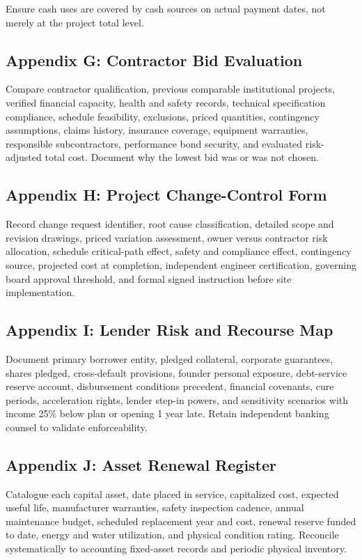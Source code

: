 Ensure cash uses are covered by cash sources on actual payment dates, not merely at the project total level.

\subsection{Appendix G: Contractor Bid Evaluation}

Compare contractor qualification, previous comparable institutional projects, verified financial capacity, health and safety records, technical specification compliance, schedule feasibility, exclusions, priced quantities, contingency assumptions, claims history, insurance coverage, equipment warranties, responsible subcontractors, performance bond security, and evaluated risk-adjusted total cost. Document why the lowest bid was or was not chosen.

\subsection{Appendix H: Project Change-Control Form}

Record change request identifier, root cause classification, detailed scope and revision drawings, priced variation assessment, owner versus contractor risk allocation, schedule critical-path effect, safety and compliance effect, contingency source, projected cost at completion, independent engineer certification, governing board approval threshold, and formal signed instruction before site implementation.

\subsection{Appendix I: Lender Risk and Recourse Map}

Document primary borrower entity, pledged collateral, corporate guarantees, shares pledged, cross-default provisions, founder personal exposure, debt-service reserve account, disbursement conditions precedent, financial covenants, cure periods, acceleration rights, lender step-in powers, and sensitivity scenarios with income 25\% below plan or opening 1 year late. Retain independent banking counsel to validate enforceability.

\subsection{Appendix J: Asset Renewal Register}

Catalogue each capital asset, date placed in service, capitalized cost, expected useful life, manufacturer warranties, safety inspection cadence, annual maintenance budget, scheduled replacement year and cost, renewal reserve funded to date, energy and water utilization, and physical condition rating. Reconcile systematically to accounting fixed-asset records and periodic physical inventory.

